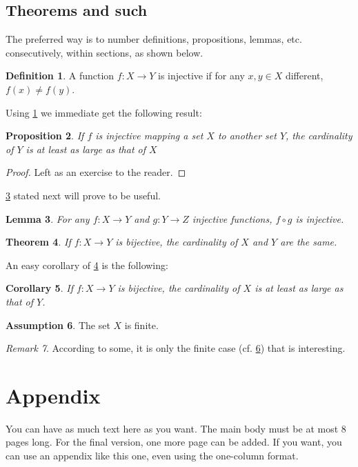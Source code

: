 \documentclass[nohyperref]{article}
\theoremstyle{plain}
\newtheorem{theorem}{Theorem}[section]
\newtheorem{proposition}[theorem]{Proposition}
\newtheorem{lemma}[theorem]{Lemma}
\newtheorem{corollary}[theorem]{Corollary}
\theoremstyle{definition}
\newtheorem{definition}[theorem]{Definition}
\newtheorem{assumption}[theorem]{Assumption}
\theoremstyle{remark}
\newtheorem{remark}[theorem]{Remark}
\begin{document}
\subsection{Theorems and such}
The preferred way is to number definitions, propositions, lemmas, etc. consecutively, within sections, as shown below.
\begin{definition}
\label{def:inj}
A function $f:X \to Y$ is injective if for any $x,y\in X$ different, $f(x)\ne f(y)$.
\end{definition}
Using \cref{def:inj} we immediate get the following result:
\begin{proposition}
If $f$ is injective mapping a set $X$ to another set $Y$, 
the cardinality of $Y$ is at least as large as that of $X$
\end{proposition}
\begin{proof} 
Left as an exercise to the reader. 
\end{proof}
\cref{lem:usefullemma} stated next will prove to be useful.
\begin{lemma}
\label{lem:usefullemma}
For any $f:X \to Y$ and $g:Y\to Z$ injective functions, $f \circ g$ is injective.
\end{lemma}
\begin{theorem}
\label{thm:bigtheorem}
If $f:X\to Y$ is bijective, the cardinality of $X$ and $Y$ are the same.
\end{theorem}
An easy corollary of \cref{thm:bigtheorem} is the following:
\begin{corollary}
If $f:X\to Y$ is bijective, 
the cardinality of $X$ is at least as large as that of $Y$.
\end{corollary}
\begin{assumption}
The set $X$ is finite.
\label{ass:xfinite}
\end{assumption}
\begin{remark}
According to some, it is only the finite case (cf. \cref{ass:xfinite}) that is interesting.
\end{remark}






\newpage
\appendix
\onecolumn
\section{Appendix}

You can have as much text here as you want. The main body must be at most $8$ pages long.
For the final version, one more page can be added.
If you want, you can use an appendix like this one, even using the one-column format.
\end{document}
